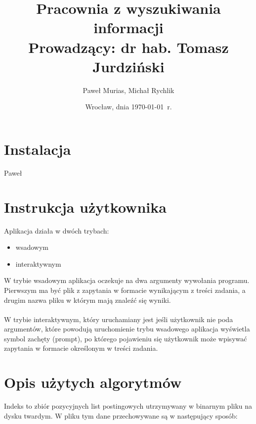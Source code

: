\documentclass[11pt,leqno]{article}
\title{{\textbf{Pracownia z wyszukiwania informacji}}\\[1ex]
       {\large Prowadzący: dr hab. Tomasz Jurdziński}}
\author{Paweł Murias, Michał Rychlik}
\date{Wrocław, dnia \today\ r.}
\begin{document}
\thispagestyle{empty}
\maketitle

\section{Instalacja}

Paweł

\section{Instrukcja użytkownika}

Aplikacja działa w dwóch trybach:

\begin{itemize}
\item wsadowym
\item interaktywnym
\end{itemize}

W trybie wsadowym aplikacja oczekuje na dwa argumenty wywołania programu. Pierwszym ma być plik z zapytania w formacie wynikającym z treści zadania, a drugim nazwa pliku w którym mają znaleźć się wyniki.\\\\
W trybie interaktywnym, który uruchamiany jest jeśli użytkownik nie poda argumentów, które powodują uruchomienie trybu wsadowego aplikacja wyświetla symbol zachęty (prompt), po którego pojawieniu się użytkownik może wpisywać zapytania w formacie określonym w treści zadania.

\section{Opis użytych algorytmów}

Indeks to zbiór pozycyjnych list postingowych utrzymywany w binarnym pliku na dysku twardym. W pliku tym dane przechowywane są w następujący sposób:
\end{document}
